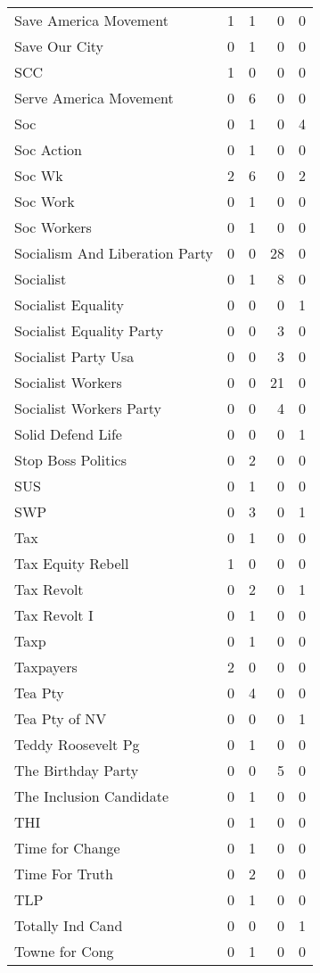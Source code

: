 \begin{supertabular}{lrrrr}
Save America Movement & 1 & 1 & 0 & 0\\
Save Our City & 0 & 1 & 0 & 0\\
SCC & 1 & 0 & 0 & 0\\
Serve America Movement & 0 & 6 & 0 & 0\\
Soc & 0 & 1 & 0 & 4\\
Soc Action & 0 & 1 & 0 & 0\\
Soc Wk & 2 & 6 & 0 & 2\\
Soc Work & 0 & 1 & 0 & 0\\
Soc Workers & 0 & 1 & 0 & 0\\
Socialism And Liberation Party & 0 & 0 & 28 & 0\\
Socialist & 0 & 1 & 8 & 0\\
Socialist Equality & 0 & 0 & 0 & 1\\
Socialist Equality Party & 0 & 0 & 3 & 0\\
Socialist Party Usa & 0 & 0 & 3 & 0\\
Socialist Workers & 0 & 0 & 21 & 0\\
Socialist Workers Party & 0 & 0 & 4 & 0\\
Solid Defend Life & 0 & 0 & 0 & 1\\
Stop Boss Politics & 0 & 2 & 0 & 0\\
SUS & 0 & 1 & 0 & 0\\
SWP & 0 & 3 & 0 & 1\\
Tax & 0 & 1 & 0 & 0\\
Tax Equity Rebell & 1 & 0 & 0 & 0\\
Tax Revolt & 0 & 2 & 0 & 1\\
Tax Revolt I & 0 & 1 & 0 & 0\\
Taxp & 0 & 1 & 0 & 0\\
Taxpayers & 2 & 0 & 0 & 0\\
Tea Pty & 0 & 4 & 0 & 0\\
Tea Pty of NV & 0 & 0 & 0 & 1\\
Teddy Roosevelt Pg & 0 & 1 & 0 & 0\\
The Birthday Party & 0 & 0 & 5 & 0\\
The Inclusion Candidate & 0 & 1 & 0 & 0\\
THI & 0 & 1 & 0 & 0\\
Time for Change & 0 & 1 & 0 & 0\\
Time For Truth & 0 & 2 & 0 & 0\\
TLP & 0 & 1 & 0 & 0\\
Totally Ind Cand & 0 & 0 & 0 & 1\\
Towne for Cong & 0 & 1 & 0 & 0\\

\end{supertabular}
